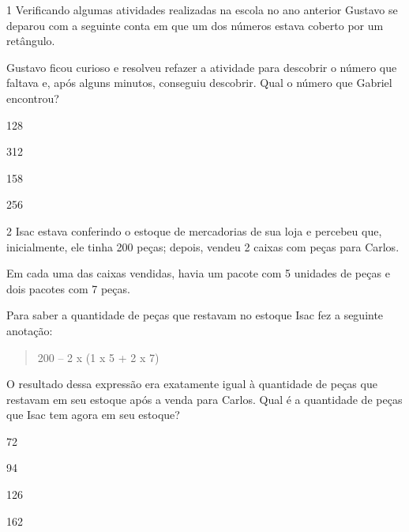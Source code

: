 
\num{1} Verificando algumas atividades realizadas na escola no ano anterior
Gustavo se deparou com a seguinte conta em que um dos números estava
coberto por um retângulo.


Gustavo ficou curioso e resolveu refazer a atividade para descobrir o
número que faltava e, após alguns minutos, conseguiu descobrir. Qual o número que Gabriel encontrou?

\begin{escolha}
\item
  128
\item
  312
\item
  158
\item
  256
\end{escolha}


\num{2} Isac estava conferindo o estoque de mercadorias de sua loja e
percebeu que, inicialmente, ele tinha 200 peças; depois, vendeu 2 caixas com peças para Carlos.

Em cada uma das caixas vendidas, havia um pacote com 5 unidades de peças e dois
pacotes com 7 peças.

Para saber a quantidade de peças que restavam no estoque Isac fez a
seguinte anotação:

\begin{quote}
200 -- 2 x (1 x 5 + 2 x 7)
\end{quote}

O resultado dessa expressão era exatamente igual à quantidade de peças
que restavam em seu estoque após a venda para Carlos. Qual é a
quantidade de peças que Isac tem agora em seu estoque?

\begin{escolha}
\item
  72
\item
  94
\item
  126
\item
  162
\end{escolha}

